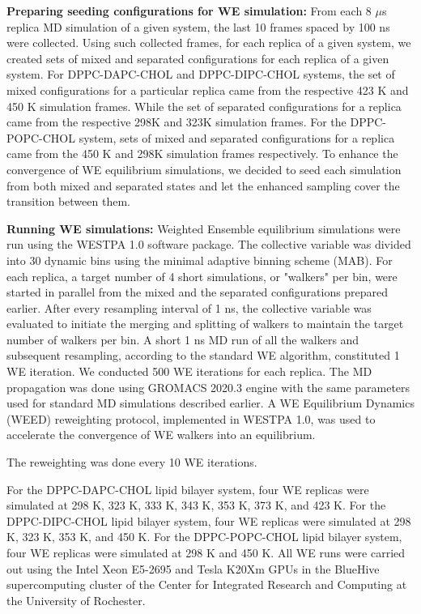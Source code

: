 \documentclass{biophys-new}
\begin{document}
\textbf{Preparing seeding configurations for WE simulation:} 
From each 8 $\mu$s replica MD simulation of a given system, the last 10 frames spaced by 100 ns were collected.
Using such collected frames, for each replica of a given system, we created sets of mixed and separated configurations for each replica of a given system.
For DPPC-DAPC-CHOL and DPPC-DIPC-CHOL systems, the set of mixed configurations for a particular replica came from the respective 423 K and 450 K simulation frames. 
While the set of separated configurations for a replica came from  the respective 298K and 323K simulation frames.
For the DPPC-POPC-CHOL system, sets of mixed and separated configurations for a replica came from the 450 K and 298K simulation frames respectively.
To enhance the convergence of WE equilibrium simulations, we decided to seed each simulation from both mixed and separated states and let the enhanced sampling cover the transition between them.

\textbf{Running WE simulations:} 
Weighted Ensemble equilibrium simulations were run using the WESTPA 1.0 software package.
The collective variable was divided into 30 dynamic bins using the minimal adaptive binning scheme (MAB).
For each replica, a target number of 4 short simulations, or "walkers" per bin, were started in parallel from the mixed and the separated configurations prepared earlier.
After every resampling interval of 1 ns, the collective variable was evaluated to initiate the merging and splitting of walkers to maintain the target number of walkers per bin.
A short 1 ns MD run of all the walkers and subsequent resampling, according to the standard WE algorithm, constituted 1 WE iteration. 
We conducted 500 WE iterations for each replica.
The MD propagation was done using GROMACS 2020.3 engine with the same parameters used for standard MD simulations described earlier.
A WE Equilibrium Dynamics (WEED) reweighting protocol, implemented in WESTPA 1.0, was used to accelerate the convergence of WE walkers into an equilibrium. 

The reweighting was done every 10 WE iterations.

For the DPPC-DAPC-CHOL lipid bilayer system, four WE replicas were simulated at 298 K, 323 K, 333 K, 343 K, 353 K, 373 K, and 423 K. 
For the DPPC-DIPC-CHOL lipid bilayer system, four WE replicas were simulated at 298 K, 323 K, 353 K, and 450 K. 
For the DPPC-POPC-CHOL lipid bilayer system, four WE replicas were simulated at 298 K and 450 K.
All WE runs were carried out using the Intel Xeon E5-2695 and Tesla K20Xm GPUs in the BlueHive supercomputing cluster of the Center for Integrated Research and
Computing at the University of Rochester.   
\end{document}
